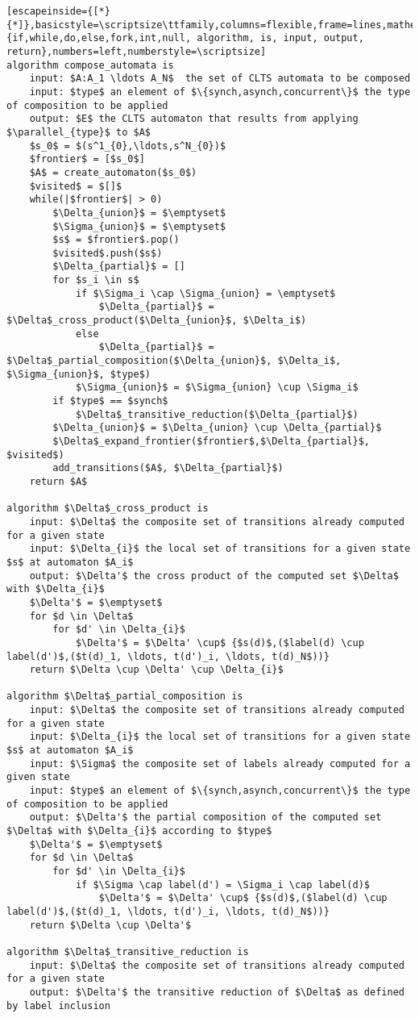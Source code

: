 \renewcommand{\ttdefault}{pcr}
\begin{lstlisting}[escapeinside={[*}{*]},basicstyle=\scriptsize\ttfamily,columns=flexible,frame=lines,mathescape=true,xleftmargin=3.0ex,keywordstyle=\textbf,morekeywords={if,while,do,else,fork,int,null, algorithm, is, input, output, return},numbers=left,numberstyle=\scriptsize]
algorithm compose_automata is
	input: $A:A_1 \ldots A_N$  the set of CLTS automata to be composed
	input: $type$ an element of $\{synch,asynch,concurrent\}$ the type of composition to be applied
	output: $E$ the CLTS automaton that results from applying $\parallel_{type}$ to $A$
	$s_0$ = $(s^1_{0},\ldots,s^N_{0})$
	$frontier$ = [$s_0$]
	$A$ = create_automaton($s_0$)
	$visited$ = $[]$
	while(|$frontier$| > 0)
		$\Delta_{union}$ = $\emptyset$
		$\Sigma_{union}$ = $\emptyset$		
		$s$ = $frontier$.pop()
		$visited$.push($s$)
		$\Delta_{partial}$ = []
		for $s_i \in s$ 
			if $\Sigma_i \cap \Sigma_{union} = \emptyset$
				$\Delta_{partial}$ = $\Delta$_cross_product($\Delta_{union}$, $\Delta_i$)
			else
				$\Delta_{partial}$ = $\Delta$_partial_composition($\Delta_{union}$, $\Delta_i$, $\Sigma_{union}$, $type$)
			$\Sigma_{union}$ = $\Sigma_{union} \cup \Sigma_i$
		if $type$ == $synch$
			$\Delta$_transitive_reduction($\Delta_{partial}$)
		$\Delta_{union}$ = $\Delta_{union} \cup \Delta_{partial}$ 
		$\Delta$_expand_frontier($frontier$,$\Delta_{partial}$, $visited$)				
		add_transitions($A$, $\Delta_{partial}$)
	return $A$

algorithm $\Delta$_cross_product is
	input: $\Delta$ the composite set of transitions already computed for a given state
	input: $\Delta_{i}$ the local set of transitions for a given state $s$ at automaton $A_i$
	output: $\Delta'$ the cross product of the computed set $\Delta$ with $\Delta_{i}$
	$\Delta'$ = $\emptyset$
	for $d \in \Delta$
		for $d' \in \Delta_{i}$
			$\Delta'$ = $\Delta' \cup$ {$s(d)$,($label(d) \cup label(d')$,($t(d)_1, \ldots, t(d')_i, \ldots, t(d)_N$))}
	return $\Delta \cup \Delta' \cup \Delta_{i}$
	
algorithm $\Delta$_partial_composition is
	input: $\Delta$ the composite set of transitions already computed for a given state
	input: $\Delta_{i}$ the local set of transitions for a given state $s$ at automaton $A_i$
	input: $\Sigma$ the composite set of labels already computed for a given state		
	input: $type$ an element of $\{synch,asynch,concurrent\}$ the type of composition to be applied
	output: $\Delta'$ the partial composition of the computed set $\Delta$ with $\Delta_{i}$ according to $type$
	$\Delta'$ = $\emptyset$
	for $d \in \Delta$
		for $d' \in \Delta_{i}$
			if $\Sigma \cap label(d') = \Sigma_i \cap label(d)$
				$\Delta'$ = $\Delta' \cup$ {$s(d)$,($label(d) \cup label(d')$,($t(d)_1, \ldots, t(d')_i, \ldots, t(d)_N$))}
	return $\Delta \cup \Delta'$	
	
algorithm $\Delta$_transitive_reduction is
	input: $\Delta$ the composite set of transitions already computed for a given state
	output: $\Delta'$ the transitive reduction of $\Delta$ as defined by label inclusion
\end{lstlisting}